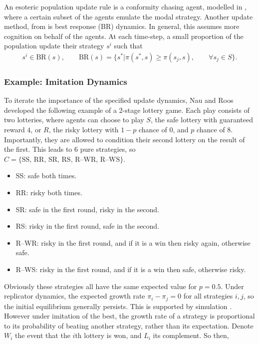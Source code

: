 An esoteric population update rule is a conformity chasing agent, modelled in \cite{RN23}, where a certain subset of the agents emulate the modal strategy. Another update method, from \cite{RN81} is best response (BR) dynamics. In general, this assumes more cognition on behalf of the agents. At each time-step, a small proportion of the population update their strategy $s^i$ such that 
\begin{align*}
    s^i \in \textrm{BR}(s), \qquad \textrm{BR}(s) = \{s^*| \pi(s^*,s) \geq \pi(s_j,s), \qquad \forall s_j \in S\}.
\end{align*}

\subsubsection{Example: Imitation Dynamics} \label{Lottery}
To iterate the importance of the specified update dynamics, Nau and Roos \cite{RN30} developed the following example of a 2-stage lottery game. Each play consists of two lotteries, where agents can choose to play $S$, the safe lottery with guaranteed reward $4$, or $R$, the risky lottery with $1-p$ chance of $0$, and $p$ chance of $8$. Importantly, they are allowed to condition their second lottery on the result of the first. This leads to 6 pure strategies, so $C = \{\textrm{SS, RR, SR, RS, R--WR, R--WS} \}$. 
\begin{itemize}
    \item SS: safe both times. 
    \item RR: risky both times. 
    \item SR: safe in the first round, risky in the second. 
    \item RS: risky in the first round, safe in the second.
    \item R--WR: risky in the first round, and if it is a win then risky again, otherwise safe.
    \item R--WS: risky in the first round, and if it is a win then safe, otherwise risky.
\end{itemize}
Obviously these strategies all have the same expected value for $p=0.5$. Under replicator dynamics, the expected growth rate $\pi_i - \pi_j = 0$ for all strategies $i,j$, so the initial equilibrium generally persists. This is supported by simulation \cite{RN30}. However under imitation of the best, the growth rate of a strategy is proportional to its probability of beating another strategy, rather than its expectation. Denote $W_i$ the event that the $i$th lottery is won, and $L_i$ its complement. So then,\\

